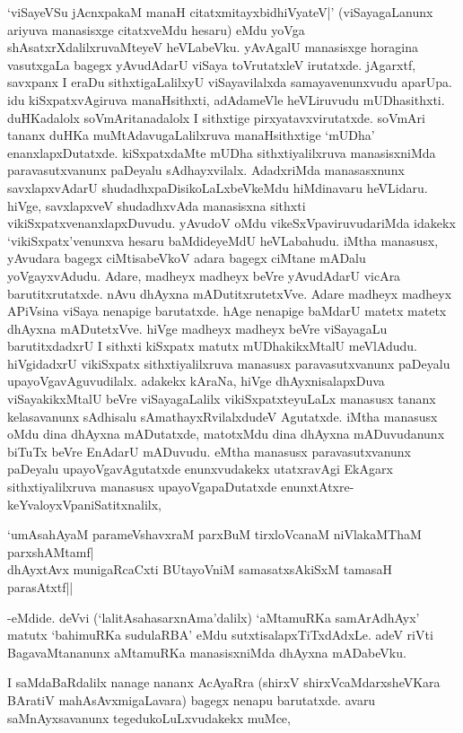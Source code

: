 `viSayeVSu jAcnxpakaM manaH citatxmitayxbidhiVyateV|' (viSayagaLanunx ariyuva manasisxge citatxveMdu hesaru) eMdu yoVga shAsatxrXdalilxruvaMteyeV heVLabeVku. yAvAgalU manasisxge horagina vasutxgaLa bagegx yAvudAdarU viSaya toVrutatxleV irutatxde. jAgarxtf, savxpanx I eraDu sithxtigaLalilxyU viSayavilalxda samayavenunxvudu aparUpa. idu kiSxpatxvAgiruva manaHsithxti, adAdameVle heVLiruvudu mUDhasithxti. duHKadalolx soVmAritanadalolx I sithxtige pirxyatavxvirutatxde. soVmAri tananx duHKa muMtAdavugaLalilxruva manaHsithxtige `mUDha' enanxlapxDutatxde. kiSxpatxdaMte mUDha sithxtiyalilxruva manasisxniMda paravasutxvanunx paDeyalu sAdhayxvilalx. AdadxriMda manasasxnunx savxlapxvAdarU shudadhxpaDisikoLaLxbeVkeMdu hiMdinavaru heVLidaru. hiVge, savxlapxveV shudadhxvAda manasisxna sithxti vikiSxpatxvenanxlapxDuvudu. yAvudoV oMdu vikeSxVpaviruvudariMda idakekx `vikiSxpatx'venunxva hesaru baMdideyeMdU heVLabahudu. iMtha manasusx, yAvudara bagegx ciMtisabeVkoV adara bagegx ciMtane mADalu yoVgayxvAdudu. Adare, madheyx madheyx beVre yAvudAdarU vicAra barutitxrutatxde. nAvu dhAyxna mADutitxrutetxVve. Adare madheyx madheyx APiVsina viSaya nenapige barutatxde. hAge nenapige baMdarU matetx matetx dhAyxna mADutetxVve. hiVge madheyx madheyx beVre viSayagaLu barutitxdadxrU I sithxti kiSxpatx matutx mUDhakikxMtalU meVlAdudu. hiVgidadxrU vikiSxpatx sithxtiyalilxruva manasusx paravasutxvanunx paDeyalu upayoVgavAguvudilalx. adakekx kAraNa, hiVge dhAyxnisalapxDuva viSayakikxMtalU beVre viSayagaLalilx vikiSxpatxteyuLaLx manasusx tananx kelasavanunx sAdhisalu sAmathayxRvilalxdudeV Agutatxde. iMtha manasusx oMdu dina dhAyxna mADutatxde, matotxMdu dina dhAyxna mADuvudanunx biTuTx beVre EnAdarU mADuvudu. eMtha manasusx paravasutxvanunx paDeyalu upayoVgavAgutatxde enunxvudakekx utatxravAgi EkAgarx sithxtiyalilxruva manasusx upayoVgapaDutatxde enunxtAtxre-keYvaloyxVpaniSatitxnalilx,

\begin{shloka}
`umAsahAyaM parameVshavxraM parxBuM tirxloVcanaM niVlakaMThaM parxshAMtamf|\\
dhAyxtAvx munigaRcaCxti BUtayoVniM samasatxsAkiSxM tamasaH parasAtxtf||
\end{shloka}

-eMdide. deVvi (`lalitAsahasarxnAma'dalilx) `aMtamuRKa samArAdhAyx' matutx `bahimuRKa sudulaRBA' eMdu sutxtisalapxTiTxdAdxLe. adeV riVti BagavaMtananunx aMtamuRKa manasisxniMda dhAyxna mADabeVku.

I saMdaBaRdalilx nanage nananx AcAyaRra (shirxV shirxVcaMdarxsheVKara BAratiV mahAsAvxmigaLavara) bagegx nenapu barutatxde. avaru saMnAyxsavanunx tegedukoLuLxvudakekx muMce,

